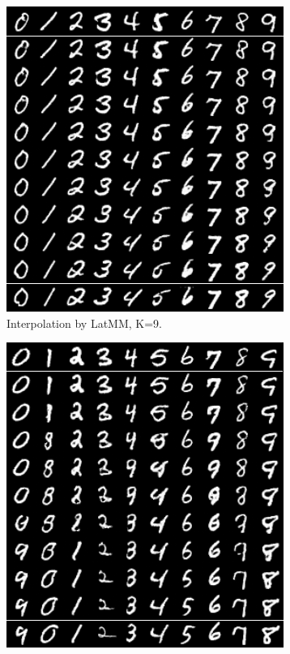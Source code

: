 \begin{figure}[!ht]
\begin{subfigure}[b]{0.3\textwidth}
    \includegraphics[width=1\linewidth]{images/mnist/interpolation/LatMMK9interpo_sample_grid.png}
    \caption{Interpolation by LatMM, K=9.}\label{fig-interpo-latmm1}
  \end{subfigure}
  \hspace{10pt}
  \begin{subfigure}[b]{0.3\textwidth}
    \centering
    \includegraphics[width=1\linewidth]{images/mnist/interpolation/interpoMNIST_heter_LatMM_K9_sample_grid.png}

\end{subfigure}
\end{figure}
